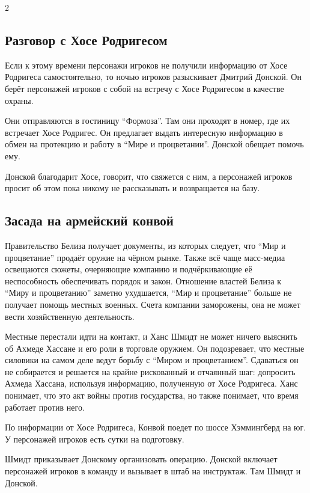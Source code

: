 \documentclass[twoside]{article}
\begin{document}
\begin{multicols}{2}
\subsection{Разговор с Хосе Родригесом}\label{rodriguez-meeting}

Если к этому времени персонажи игроков не получили информацию от Хосе
Родригеса самостоятельно, то ночью игроков разыскивает Дмитрий Донской.
Он берёт персонажей игроков с собой на встречу с Хосе Родригесом в
качестве охраны.

Они отправляются в гостиницу \enquote{Формоза}. Там они проходят в номер, где их
встречает Хосе Родригес. Он предлагает выдать интересную информацию в
обмен на протекцию и работу в \enquote{Мире и процветании}. Донской обещает
помочь ему.

Донской благодарит Хосе, говорит, что свяжется с ним, а персонажей
игроков просит об этом пока никому не рассказывать и возвращается на
базу.

\subsection{Засада на армейский конвой}\label{army-convoy-ambush}

Правительство Белиза получает документы, из которых следует, что \enquote{Мир и
процветание} продаёт оружие на чёрном рынке. Также всё чаще масс-медиа
освещаются сюжеты, очерняющие компанию и подчёркивающие её неспособность
обеспечивать порядок и закон. Отношение властей Белиза к \enquote{Миру и
процветанию} заметно ухудшается, \enquote{Мир и процветание} больше не получает
помощь местных военных. Счета компании заморожены, она не может вести
хозяйственную деятельность.

Местные перестали идти на контакт, и Ханс Шмидт не может ничего выяснить
об Ахмеде Хассане и его роли в торговле оружием. Он подозревает, что
местные силовики на самом деле ведут борьбу с \enquote{Миром и процветанием}.
Сдаваться он не собирается и решается на крайне рискованный и отчаянный
шаг: допросить Ахмеда Хассана, используя информацию, полученную от Хосе
Родригеса. Ханс понимает, что это акт войны против государства, но также
понимает, что время работает против него.

По информации от Хосе Родригеса, Конвой поедет по шоссе Хэммингберд на
юг. У персонажей игроков есть сутки на подготовку.

Шмидт приказывает Донскому организовать операцию. Донской включает
персонажей игроков в команду и вызывает в штаб на инструктаж. Там Шмидт
и Донской.


\end{multicols}
\end{document}
